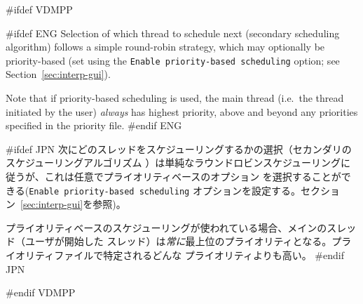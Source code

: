 \documentclass[\pformat,12pt]{article}
\newcommand{\vdmslpp}{VDM-SL}
\newcommand{\Toolbox}{Toolbox}
\newcommand{\vdmslpp}{VDM++}
\newcommand{\Toolbox}{Toolbox}
\newcommand{\guicmd}[1]{{\sf #1}}
\newcommand{\guicmd}[1]{{\gt #1}}
\begin{document}
#ifdef VDMPP

#ifdef ENG
Selection of which thread to schedule next (secondary scheduling
algorithm) follows a simple round-robin strategy, which may optionally
be priority-based (set using the \texttt{Enable priority-based
  scheduling} option; see Section~\ref{sec:interp-gui}).

Note that if priority-based scheduling is used, the main thread
(i.e.\ the thread initiated by the user) \textit{always} has highest
priority, above and beyond any priorities specified in the priority
file.
#endif ENG

#ifdef JPN
次にどのスレッドをスケジューリングするかの選択（セカンダリのスケジューリングアルゴリズム
）は単純なラウンドロビンスケジューリングに従うが、これは任意でプライオリティベースのオプション
を選択することができる(\texttt{Enable priority-based
  scheduling} オプションを設定する。セクション~\ref{sec:interp-gui}を参照)。

プライオリティベースのスケジューリングが使われている場合、メインのスレッド（ユーザが開始した
スレッド）は\textit{常に}最上位のプライオリティとなる。プライオリティファイルで特定されるどんな
プライオリティよりも高い。 
#endif JPN

#endif VDMPP


% 
%


\end{document}
